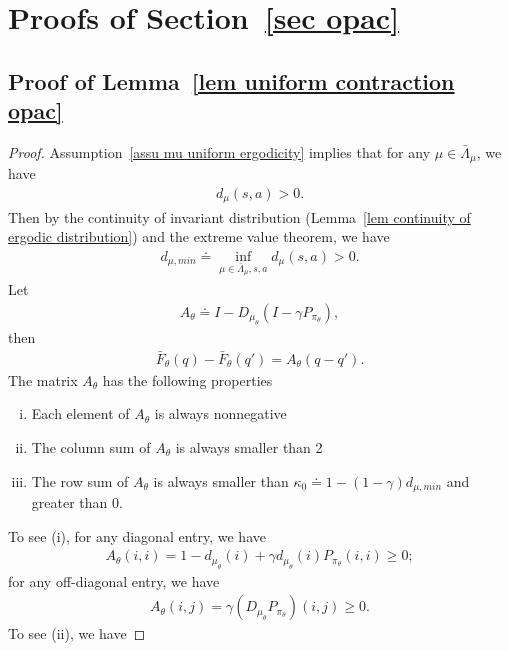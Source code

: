 \documentclass[twoside,11pt]{article}
\numberwithin{assucounter}{section}
\begin{document}
\section{Proofs of Section~\ref{sec opac}}
\subsection{Proof of Lemma~\ref{lem uniform contraction opac}}

\lemuniformcontractionopac*
\label{sec proof lem uniform contraction opac}
\begin{proof}
  Assumption~\ref{assu mu uniform ergodicity} implies that for any $\mu \in \bar \Lambda_\mu$,
  we have 
  \begin{align}
    d_\mu(s, a) > 0.
  \end{align}
  Then 
  by the continuity of invariant distribution (Lemma~\ref{lem continuity of ergodic distribution}) and the extreme value theorem,
  we have
  \begin{align}
      d_{\mu, min} \doteq \inf_{\mu \in \bar \Lambda_\mu, s, a} d_\mu(s, a) > 0.
  \end{align}
  Let
  \begin{align}
    \label{eq definition of a theta}
      A_\theta \doteq I - D_{\mu_\theta}(I - \gamma P_{\pi_\theta}),
  \end{align}
  then
  \begin{align}
    \bar F_\theta(q) - \bar F_\theta(q') = A_\theta(q - q').
  \end{align}
  The matrix $A_\theta$ has the following properties
  \begin{enumerate}[(i).]
    \item Each element of $A_\theta$ is always nonnegative
    \item The column sum of $A_\theta$ is always smaller than 2
    \item The row sum of $A_\theta$ is always smaller than $\kappa_0 \doteq 1 - (1-\gamma)d_{\mu, min}$ and greater than 0.
  \end{enumerate}
  To see (i),
  for any diagonal entry, we have
  \begin{align}
    A_\theta(i, i) = 1 - d_{\mu_\theta}(i) + \gamma d_{\mu_\theta}(i) P_{\pi_\theta}(i, i) \geq 0;
  \end{align}
  for any off-diagonal entry, we have
  \begin{align}
    A_\theta(i, j) = \gamma (D_{\mu_\theta}P_{\pi_\theta})(i, j) \geq 0.
  \end{align}
  To see (ii), we have

\end{proof}
\end{document}
